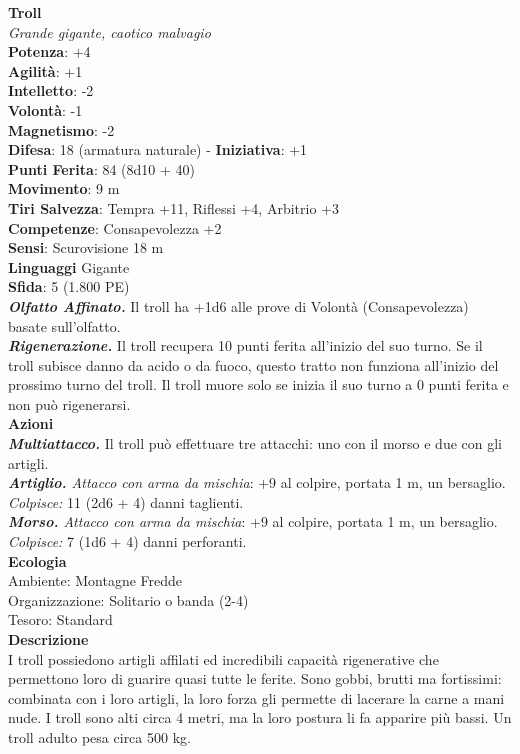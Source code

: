 \begin{multicols}{2}
\medskip\textbf{Troll}\\
\emph{Grande gigante, caotico malvagio}\\
\textbf{Potenza}: +4\\
\textbf{Agilità}: +1\\
\textbf{Intelletto}: -2\\
\textbf{Volontà}: -1\\
\textbf{Magnetismo}: -2\\
\textbf{Difesa}: 18 (armatura naturale) - \textbf{Iniziativa}: +1\\
\textbf{Punti Ferita}: 84 (8d10 + 40)\\
\textbf{Movimento}: 9 m\\
\textbf{Tiri Salvezza}: Tempra +11, Riflessi +4, Arbitrio +3\\
\textbf{Competenze}: Consapevolezza +2\\
\textbf{Sensi}: Scurovisione 18 m\\
\textbf{Linguaggi} Gigante\\
\textbf{Sfida}: 5 (1.800 PE)\smallskip\\
\emph{\textbf{Olfatto Affinato.}} Il troll ha +1d6 alle prove di Volontà (Consapevolezza) basate sull'olfatto.\\
\emph{\textbf{Rigenerazione.}} Il troll recupera 10 punti ferita all'inizio del suo turno. Se il troll subisce danno da acido o da fuoco, questo tratto non funziona all'inizio del prossimo turno del troll. Il troll muore solo se inizia il suo turno a 0 punti ferita e non può rigenerarsi.\\
\smallskip\textbf{Azioni}\\
\emph{\textbf{Multiattacco.}} Il troll può effettuare tre attacchi: uno con il morso e due con gli artigli.\\
\emph{\textbf{Artiglio.} Attacco con arma da mischia}: +9 al colpire, portata 1 m, un bersaglio.\\
\emph{Colpisce:} 11 (2d6 + 4) danni taglienti.\\
\emph{\textbf{Morso.} Attacco con arma da mischia}: +9 al colpire, portata 1 m, un bersaglio.\\
\emph{Colpisce:} 7 (1d6 + 4) danni perforanti.\\
\textbf{Ecologia}\\
Ambiente: Montagne Fredde\\
Organizzazione: Solitario o banda (2-4)\\
Tesoro: Standard\\
\textbf{Descrizione}\\
I troll possiedono artigli affilati ed incredibili capacità rigenerative che permettono loro di guarire quasi tutte le ferite. Sono gobbi, brutti ma fortissimi: combinata con i loro artigli, la loro forza gli permette di lacerare la carne a mani nude. I troll sono alti circa 4 metri, ma la loro postura li fa apparire più bassi. Un troll adulto pesa circa 500 kg.\\


\end{multicols}
